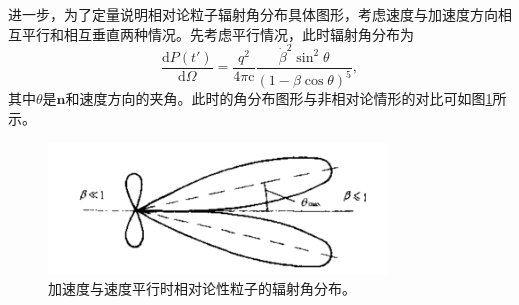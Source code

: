 \documentclass[../天体物理基础.tex]{subfiles}
\begin{document}
进一步，为了定量说明相对论粒子辐射角分布具体图形，考虑速度与加速度方向相互平行和相互垂直两种情况。先考虑平行情况，此时辐射角分布为
\begin{equation}
\frac{\mathrm{d}P\left(t'\right)}{\mathrm{d}\Omega}=\frac{q^{2}}{4\pi\mathrm{c}}\frac{\dot{\beta}^{2}\sin^{2}\theta}{\left(1-\beta\cos\theta\right)^{5}},
\end{equation}
其中$\theta$是$\boldsymbol{n}$和速度方向的夹角。此时的角分布图形与非相对论情形的对比可如图\ref{加速度与速度平行时相对论性粒子的辐射角分布。}所示。
\begin{figure}[!htbp]
\centering
\includegraphics[width=9cm]{figures/figure1_6.png}
\captionsetup{justification=raggedright, singlelinecheck=false}
\caption{加速度与速度平行时相对论性粒子的辐射角分布。}
\label{加速度与速度平行时相对论性粒子的辐射角分布。}
\end{figure}
\end{document}
